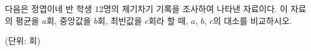 다음은 정엽이네 반 학생 $12$명의 제기차기 기록을 조사하여 나타낸 자료이다. 이 자료의 평균을 $a$회, 중앙값을 $b$회, 최빈값을 $c$회라 할 때, $a$, $b$, $c$의 대소를 비교하시오.\par{\raggedleft\small (단위: 회)\par}
